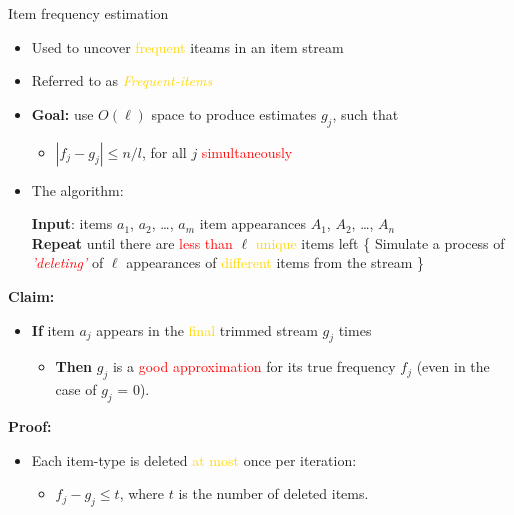 \documentclass[first=dgreen,second=purple,logo=redque]{aaltoslides}
\newcommand{\IndState}{\State\hspace{\algorithmicindent}}
\begin{document}
\begin{frame}[allowframebreaks=1]{Item frequency estimation}
\begin{itemize}
    \item Used to uncover \textcolor{gold}{frequent} iteams in an item stream 
	\item Referred to as \textcolor{gold}{\textit{Frequent-items}}
	\item \textbf{Goal:} use $O(\ell)$ space to produce estimates $g_{j}$, such
	that
	\begin{itemize}\item{$|f_{j} - g_{j} | \leq n/l$}, for all $j$
	\textcolor{red}{simultaneously}\end{itemize}

\item The algorithm:
  \begin{algorithmic}
    \State \textbf{Input}: \textcolor{dgreen}{items} $a_{1}$, $a_{2}$, \ldots,
    $a_{m}$
    \IndState \textcolor{dgreen}{item appearances} $A_{1}$, $A_{2}$, \ldots,
    $A_{n}$
    \\\State \textbf{Repeat} until there are \textcolor{red}{less than}
    $\ell$ \textcolor{gold}{unique} items left \{
     \IndState Simulate a process of
     \textcolor{red}{\textit{'deleting'}} of $\ell$ appearances of
     \IndState \textcolor{gold}{different} items from the stream
    \State \}
  \end{algorithmic}
\end{itemize}


\framebreak

\textbf{Claim:}

\begin{itemize}
\item \textbf{If} item $a_{j}$ appears in the \textcolor{gold}{final} trimmed
stream $g_{j}$ times
\begin{itemize}
  \item \textbf{Then} $g_{j}$ is a \textcolor{red}{good approximation} for its
  true frequency $f_{j}$ (even in the case of $g_{j}$ = 0).
\end{itemize}         
\end{itemize}

\textbf{Proof:}
\begin{itemize}
   \item Each item-type is deleted \textcolor{gold}{at most} once per iteration:
   \begin{itemize} \item $f_{j} - g_{j} \leq t$, where $t$ is the
   number of deleted items.\end{itemize}
\end{itemize}


\end{frame}
\end{document}
